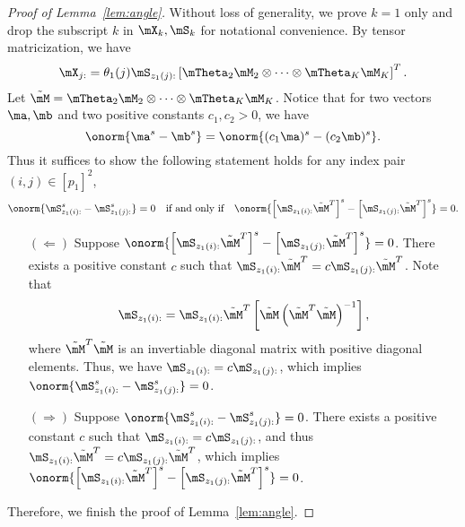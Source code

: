 \documentclass[lettersize,onecolumn,journal]{IEEEtran}
\theoremstyle{definition}
\theoremstyle{definition}
\newcommand{\of}[1]{\left(#1\right)}
\newcommand{\off}[1]{\left[#1\right]}
\begin{document}
\begin{proof}[Proof of Lemma~\ref{lem:angle}] Without loss of generality, we prove $k = 1$ only and drop the subscript $k$ in $\mX_k, \mS_k$ for notational convenience. 
By tensor matricization, we have
\begin{equation}
    \mX_{j:} = \theta_1(j) \mS_{z_1(j):} \off{\mTheta_2 \mM_2 \otimes \cdots \otimes \mTheta_K \mM_K}^T.
\end{equation}     
Let $\tilde \mM = \mTheta_2 \mM_2 \otimes \cdots \otimes \mTheta_K \mM_K$. Notice that for two vectors $\ma, \mb$ and two positive constants $c_1, c_2 >0$, we have
\begin{equation}
\onorm{\ma^s - \mb^s} = \onorm{(c_1 \ma)^s - (c_2\mb)^s}.
\end{equation}
Thus it suffices to show the following statement holds for any index pair $(i,j)\in[p_1]^2$,
\begin{equation}
\onorm{ \mS_{z_1(i):}^s - \mS_{z_1(j):}^s} = 0 \quad \text{if and only if} \quad \onorm{ \off{\mS_{z_1(i):} \tilde \mM^T }^s - \off{\mS_{z_1(j):}\tilde \mM^T}^s} = 0.
\end{equation}
\begin{enumerate}[wide]
    \item[$(\Leftarrow)$] Suppose $\onorm{ \off{\mS_{z_1(i):} \tilde \mM^T }^s - \off{\mS_{z_1(j):}\tilde \mM^T}^s} = 0$. There exists a positive constant $c$ such that $\mS_{z_1(i):} \tilde \mM^T= c \mS_{z_1(j):} \tilde \mM^T$. Note that
\begin{equation}
    \mS_{z_1(i):} = \mS_{z_1(i):} \tilde \mM^T \off{ \tilde \mM \of{ \tilde \mM^T  \tilde \mM}^{-1}},
\end{equation}
where $ \tilde \mM^T  \tilde \mM$ is an invertiable diagonal matrix with positive diagonal elements. Thus, we have $ \mS_{z_1(i):} = c  \mS_{z_1(j):}$, which implies $ \onorm{  \mS_{z_1(i):}^s -  \mS_{z_1(j):}^s } = 0 $.

\item[$(\Rightarrow)$] Suppose $ \onorm{ \mS_{z_1(i):}^s - \mS_{z_1(j):}^s } = 0 $. There exists a positive constant $c$ such that $\mS_{z_1(i):} = c \mS_{z_1(j):}$, and thus $\mS_{z_1(i):} \tilde \mM^T = c \mS_{z_1(j):} \tilde \mM^T$, which implies $\onorm{\left[\mS_{z_1(i):} \tilde \mM^T\right]^s- \left[\mS_{z_1(j):} \tilde \mM^T\right]^s}=0$.
\end{enumerate}
Therefore, we finish the proof of Lemma~\ref{lem:angle}.
\end{proof}
\end{document}
